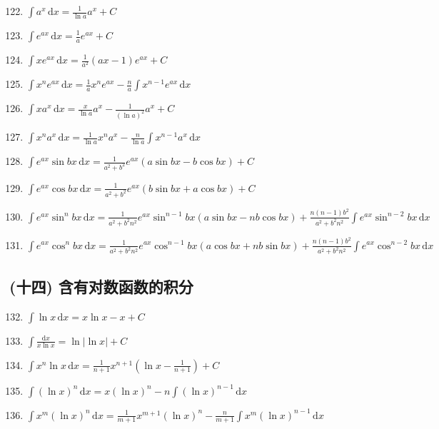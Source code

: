 \begin{enumerate}
    \setcounter{enumi}{121}
    \item $\displaystyle \int a^x \, \mathrm{d}x = \frac{1}{\ln a} a^x + C$
    \item $\displaystyle \int e^{ax} \, \mathrm{d}x = \frac{1}{a} e^{ax} + C$
    \item $\displaystyle \int x e^{ax} \, \mathrm{d}x = \frac{1}{a^2} (ax - 1) e^{ax} + C$
    \item $\displaystyle \int x^n e^{ax} \, \mathrm{d}x = \frac{1}{a} x^n e^{ax} - \frac{n}{a} \int x^{n-1} e^{ax} \, \mathrm{d}x$
    \item $\displaystyle \int x a^x \, \mathrm{d}x = \frac{x}{\ln a} a^x - \frac{1}{(\ln a)^2} a^x + C$
    \item $\displaystyle \int x^n a^x \, \mathrm{d}x = \frac{1}{\ln a} x^n a^x - \frac{n}{\ln a} \int x^{n-1} a^x \, \mathrm{d}x$
    \item $\displaystyle \int e^{ax} \sin bx \, \mathrm{d}x = \frac{1}{a^2 + b^2} e^{ax} (a \sin bx - b \cos bx) + C$
    \item $\displaystyle \int e^{ax} \cos bx \, \mathrm{d}x = \frac{1}{a^2 + b^2} e^{ax} (b \sin bx + a \cos bx) + C$
    \item $\displaystyle \int e^{ax} \sin^n bx \, \mathrm{d}x = \frac{1}{a^2 + b^2 n^2} e^{ax} \sin^{n-1} bx (a \sin bx - n b \cos bx) + \frac{n(n-1)b^2}{a^2 + b^2 n^2} \int e^{ax} \sin^{n-2} bx \, \mathrm{d}x$
    \item $\displaystyle \int e^{ax} \cos^n bx \, \mathrm{d}x = \frac{1}{a^2 + b^2 n^2} e^{ax} \cos^{n-1} bx (a \cos bx + n b \sin bx) + \frac{n(n-1)b^2}{a^2 + b^2 n^2} \int e^{ax} \cos^{n-2} bx \, \mathrm{d}x$
\end{enumerate}

\subsection*{(十四) 含有对数函数的积分}

\begin{enumerate}
    \setcounter{enumi}{131}
    \item $\displaystyle \int \ln x \, \mathrm{d}x = x \ln x - x + C$
    \item $\displaystyle \int \frac{\mathrm{d}x}{x \ln x} = \ln |\ln x| + C$
    \item $\displaystyle \int x^n \ln x \, \mathrm{d}x = \frac{1}{n + 1} x^{n+1} \left( \ln x - \frac{1}{n + 1} \right) + C$
    \item $\displaystyle \int (\ln x)^n \, \mathrm{d}x = x (\ln x)^n - n \int (\ln x)^{n-1} \, \mathrm{d}x$
    \item $\displaystyle \int x^m (\ln x)^n \, \mathrm{d}x = \frac{1}{m + 1} x^{m+1} (\ln x)^n - \frac{n}{m + 1} \int x^m (\ln x)^{n-1} \, \mathrm{d}x$
\end{enumerate}

